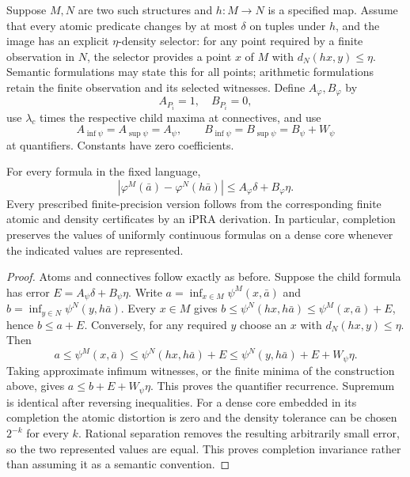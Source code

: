 Suppose $M,N$ are two such structures and $h:M\to N$ is a specified map.
Assume that every atomic predicate changes by at most $\delta$ on tuples
under $h$, and the image has an explicit $\eta$-density selector: for any
point required by a finite observation in $N$, the selector provides a point
$x$ of $M$ with $d_N(hx,y)\leq\eta$. Semantic formulations may state this
for all points; arithmetic formulations retain the finite observation and
its selected witnesses. Define $A_\varphi,B_\varphi$ by
\[
 A_{P_i}=1,\quad B_{P_i}=0,
\]
use $\lambda_c$ times the respective child maxima at connectives, and use
\[
 A_{\inf\psi}=A_{\sup\psi}=A_\psi,
 \qquad B_{\inf\psi}=B_{\sup\psi}=B_\psi+W_\psi
\]
at quantifiers. Constants have zero coefficients.

\begin{theorem}
\label{thm:approx-elementarity}
For every formula in the fixed language,
\begin{equation}
 |\varphi^M(\bar a)-\varphi^N(h\bar a)|
 \leq A_\varphi\delta+B_\varphi\eta.
 \label{eq:approx-elementarity}
\end{equation}
Every prescribed finite-precision version follows from the corresponding
finite atomic and density certificates by an iPRA derivation. In particular,
completion preserves the values of uniformly continuous formulas on a dense
core whenever the indicated values are represented.
\end{theorem}

\begin{proof}
Atoms and connectives follow exactly as before. Suppose the child formula
has error $E=A_\psi\delta+B_\psi\eta$. Write
$a=\inf_{x\in M}\psi^M(x,\bar a)$ and
$b=\inf_{y\in N}\psi^N(y,h\bar a)$. Every $x\in M$ gives
$b\leq\psi^N(hx,h\bar a)\leq\psi^M(x,\bar a)+E$, hence $b\leq a+E$.
Conversely, for any required $y$ choose an $x$ with
$d_N(hx,y)\leq\eta$. Then
\[
 a\leq\psi^M(x,\bar a)
 \leq\psi^N(hx,h\bar a)+E
 \leq\psi^N(y,h\bar a)+E+W_\psi\eta.
\]
Taking approximate infimum witnesses, or the finite minima of the
construction above, gives $a\leq b+E+W_\psi\eta$. This proves the quantifier
recurrence. Supremum is identical after reversing inequalities.
For a dense core embedded in its completion the atomic distortion is zero
and the density tolerance can be chosen $2^{-k}$ for every $k$. Rational
separation removes the resulting arbitrarily small error, so the two
represented values are equal. This proves completion invariance rather
than assuming it as a semantic convention.
\end{proof}


